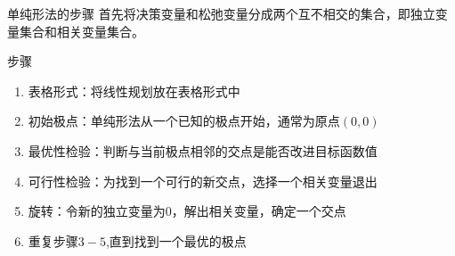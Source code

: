 \documentclass[UTF8]{ctexbeamer}
\begin{document}
\begin{frame}{单纯形法的步骤}
  首先将决策变量和松弛变量分成两个互不相交的集合，即独立变量集合和相关变量集合。

  \begin{block}{步骤}
    \begin{enumerate}
    \item 表格形式：将线性规划放在表格形式中
    \item 初始极点：单纯形法从一个已知的极点开始，通常为原点$(0,0)$
    \item 最优性检验：判断与当前极点相邻的交点是能否改进目标函数值
    \item 可行性检验：为找到一个可行的新交点，选择一个相关变量退出
    \item 旋转：令新的独立变量为0，解出相关变量，确定一个交点
    \item 重复步骤$3 - 5$,直到找到一个最优的极点
    \end{enumerate}
  \end{block}

\end{frame}
\end{document}
